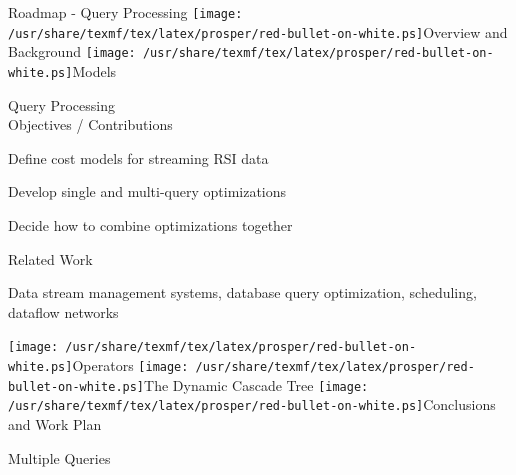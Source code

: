 \documentclass[final,total,bgColor,slideColor,pdf,ps2pdf,default,noaccumulate]{prosper}
\newcommand{\ii}{\texttt{[image: /usr/share/texmf/tex/latex/prosper/red-bullet-on-white.ps]}}
\begin{document}

\begin{slide}{Roadmap - Query Processing}
  {\tiny \ii Overview and Background \ii Models }
  \begin{Itemize}
  \item Query Processing \\ {\blue Objectives / Contributions }
    \begin{Itemize}
    \item Define cost models for streaming RSI data
    \item Develop single and multi-query optimizations
    \item Decide how to combine optimizations together
    \end{Itemize} 
    {\blue Related Work }
    \begin{Itemize}
    \item Data stream management systems, database query
      optimization, scheduling, dataflow networks
    \end{Itemize}
  \end{Itemize}
  {\tiny \ii Operators \ii The Dynamic Cascade Tree \ii Conclusions and Work Plan }
\end{slide}

\begin{slide}{Multiple Queries}
  \centering
  \scalebox{0.8}{}
\end{slide}
\end{document}
